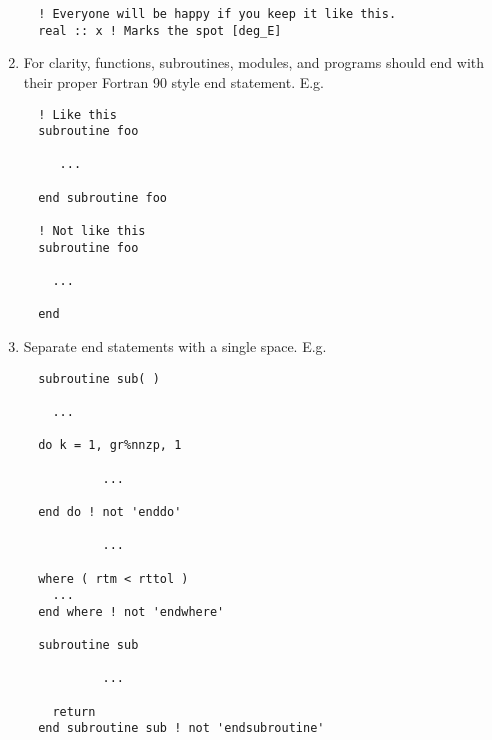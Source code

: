 \documentclass[letterpaper,12pt]{article}
\begin{document}
\begin{enumerate}
\begin{verbatim}
  ! Everyone will be happy if you keep it like this.
  real :: x ! Marks the spot [deg_E]
\end{verbatim}

\item For clarity, functions, subroutines, modules, and programs should end 
with their proper Fortran 90 style end statement. \newline
E.g.
\begin{verbatim}
  ! Like this
  subroutine foo

     ...

  end subroutine foo

  ! Not like this
  subroutine foo

    ...

  end
\end{verbatim}

\item Separate end statements with a single space. \newline 
E.g.
\begin{verbatim}
  subroutine sub( )

    ...

  do k = 1, gr%nnzp, 1

           ...

  end do ! not 'enddo'

           ...

  where ( rtm < rttol )
    ...
  end where ! not 'endwhere'

  subroutine sub

           ...

    return
  end subroutine sub ! not 'endsubroutine'
\end{verbatim}




\end{enumerate}
\end{document}
